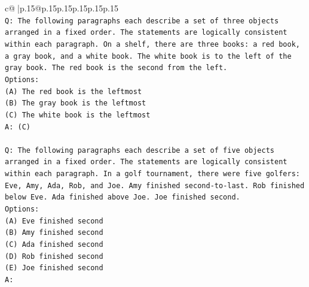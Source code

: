 \documentclass{article}
\begin{document}
{\begin{supertabular}{c@{$\;$}|p{.15\linewidth}@{}p{.15\linewidth}p{.15\linewidth}p{.15\linewidth}p{.15\linewidth}p{.15\linewidth}}
{{{\\ 
\texttt{Q: The following paragraphs each describe a set of three objects arranged in a fixed order. The statements are logically consistent within each paragraph. On a shelf, there are three books: a red book, a gray book, and a white book. The white book is to the left of the gray book. The red book is the second from the left.} \\
\texttt{Options:} \\
\texttt{(A) The red book is the leftmost} \\
\texttt{(B) The gray book is the leftmost} \\
\texttt{(C) The white book is the leftmost} \\
\texttt{A: (C)} \\
\\ 
\texttt{Q: The following paragraphs each describe a set of five objects arranged in a fixed order. The statements are logically consistent within each paragraph. In a golf tournament, there were five golfers: Eve, Amy, Ada, Rob, and Joe. Amy finished second{-}to{-}last. Rob finished below Eve. Ada finished above Joe. Joe finished second.} \\
\texttt{Options:} \\
\texttt{(A) Eve finished second} \\
\texttt{(B) Amy finished second} \\
\texttt{(C) Ada finished second} \\
\texttt{(D) Rob finished second} \\
\texttt{(E) Joe finished second} \\
\texttt{A:} \\
            }
        }
    }
     \\ \\


\end{supertabular}}
\end{document}
